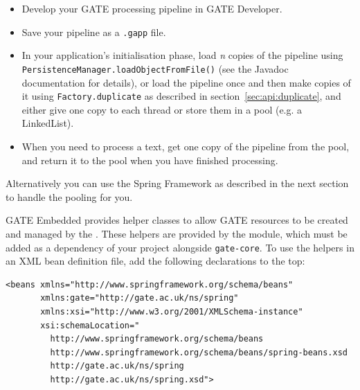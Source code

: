 \begin{itemize}
\item Develop your GATE processing pipeline in GATE Developer.
\item Save your pipeline as a \texttt{.gapp} file.
\item In your application's initialisation phase, load {\em n} copies of the
pipeline using \texttt{PersistenceManager.loadObjectFromFile()} (see the
Javadoc documentation for details), or load the pipeline once and then make
copies of it using \texttt{Factory.duplicate} as described in
section~\ref{sec:api:duplicate}, and either give one copy to each thread or
store them in a pool (e.g. a LinkedList).
\item When you need to process a text, get one copy of the pipeline from the
pool, and return it to the pool when you have finished processing.
\end{itemize}

Alternatively you can use the Spring Framework as described in the next section
to handle the pooling for you.


GATE Embedded provides helper classes to allow GATE resources to be created and
managed by the .
These helpers are provided by the
module, which must be added as a dependency of your project alongside
\verb!gate-core!.  To use the helpers in an XML bean definition file, add the
following declarations to the top:
\begin{small}\begin{verbatim}
<beans xmlns="http://www.springframework.org/schema/beans"
       xmlns:gate="http://gate.ac.uk/ns/spring"
       xmlns:xsi="http://www.w3.org/2001/XMLSchema-instance"
       xsi:schemaLocation="
         http://www.springframework.org/schema/beans
         http://www.springframework.org/schema/beans/spring-beans.xsd
         http://gate.ac.uk/ns/spring
         http://gate.ac.uk/ns/spring.xsd">
\end{verbatim}\end{small}

